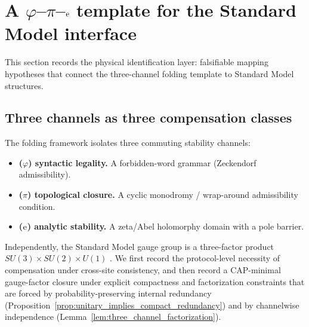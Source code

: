 
\section{A \texorpdfstring{$\varphi$--$\pi$--$\mathrm{e}$}{phi--pi--e} template for the Standard Model interface}
\label{sec:sm_interface}

This section records the physical identification layer: falsifiable mapping hypotheses that connect the three-channel folding template to Standard Model structures.

\subsection{Three channels as three compensation classes}
\label{subsec:gauge_as_compensation}

The folding framework isolates three commuting stability channels:
\begin{itemize}
\item \textbf{($\varphi$) syntactic legality.} A forbidden-word grammar (Zeckendorf admissibility).
\item \textbf{($\pi$) topological closure.} A cyclic monodromy / wrap-around admissibility condition.
\item \textbf{($\mathrm{e}$) analytic stability.} A zeta/Abel holomorphy domain with a pole barrier.
\end{itemize}

Independently, the Standard Model gauge group is a three-factor product $SU(3)\times SU(2)\times U(1)$ \cite{PeskinSchroeder1995}.
We first record the protocol-level necessity of compensation under cross-site consistency, and then record a CAP-minimal gauge-factor closure under explicit compactness and factorization constraints that are forced by probability-preserving internal redundancy (Proposition~\ref{prop:unitary_implies_compact_redundancy}) and by channelwise independence (Lemma~\ref{lem:three_channel_factorization}).

